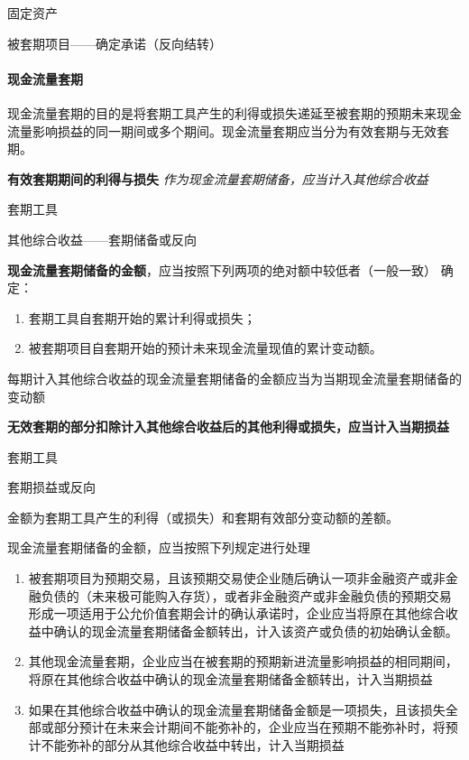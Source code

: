 \documentclass[UTF8,12pt]{ctexart}
\newenvironment{Dr}{%
	\begin{list}{}%
		{
			\setlength{\leftmargin}{2em}
			\setlength{\labelwidth}{2em}
			\setlength{\labelsep}{0pt}
			\setlength{\itemindent}{0pt}
			\setlength{\listparindent}{0pt}
			\setlength{\parsep}{0pt}
			\setlength{\topsep}{0pt}
		}
		\item[\textbf{借：}]
	}{%
	\end{list}
}
\newenvironment{Cr}{%
	\begin{list}{}%
		{
			\setlength{\leftmargin}{3em}
			\setlength{\labelwidth}{2em}
			\setlength{\labelsep}{0pt}
			\setlength{\itemindent}{0pt}
			\setlength{\listparindent}{0pt}
			\setlength{\parsep}{0pt}
			\setlength{\topsep}{0pt}
		}
		\item[\textbf{贷：}]
	}{%
	\end{list}
}
\numberwithin{equation}{section} %
\numberwithin{figure}{section}
\numberwithin{table}{section}
\begin{document}
	\begin{Dr}
		固定资产
	\end{Dr}
	\begin{Cr}
		被套期项目——确定承诺（反向结转）
	\end{Cr}
	
	
	\paragraph{现金流量套期}
	现金流量套期的目的是将套期工具产生的利得或损失递延至被套期的预期未来现金流量影响损益的同一期间或多个期间。现金流量套期应当分为有效套期与无效套期。
	
	\textbf{有效套期期间的利得与损失}
	\textit{作为现金流量套期储备，应当计入其他综合收益}
	
	\begin{Dr}
		套期工具
	\end{Dr}
	\begin{Cr}
		其他综合收益——套期储备或反向
	\end{Cr}

	
	\textbf{现金流量套期储备的金额}，应当按照下列两项的绝对额中较低者（一般一致） 确定：
	\begin{enumerate}
		\item 套期工具自套期开始的累计利得或损失；
		
		\item 被套期项目自套期开始的预计未来现金流量现值的累计变动额。
	\end{enumerate}
	
	每期计入其他综合收益的现金流量套期储备的金额应当为当期现金流量套期储备的变动额
	
	\textbf{无效套期的部分扣除计入其他综合收益后的其他利得或损失，应当计入当期损益}
	
	\begin{Dr}
		套期工具
	\end{Dr}
	\begin{Cr}
		套期损益或反向
	\end{Cr}
	
	金额为套期工具产生的利得（或损失）和套期有效部分变动额的差额。
	
	现金流量套期储备的金额，应当按照下列规定进行处理
	\begin{enumerate}
		\item 被套期项目为预期交易，且该预期交易使企业随后确认一项非金融资产或非金融负债的（未来极可能购入存货），或者非金融资产或非金融负债的预期交易形成一项适用于公允价值套期会计的确认承诺时，企业应当将原在其他综合收益中确认的现金流量套期储备金额转出，计入该资产或负债的初始确认金额。
		
		\item 其他现金流量套期，企业应当在被套期的预期新进流量影响损益的相同期间，将原在其他综合收益中确认的现金流量套期储备金额转出，计入当期损益
		
		\item 如果在其他综合收益中确认的现金流量套期储备金额是一项损失，且该损失全部或部分预计在未来会计期间不能弥补的，企业应当在预期不能弥补时，将预计不能弥补的部分从其他综合收益中转出，计入当期损益
	\end{enumerate}
	
\end{document}
